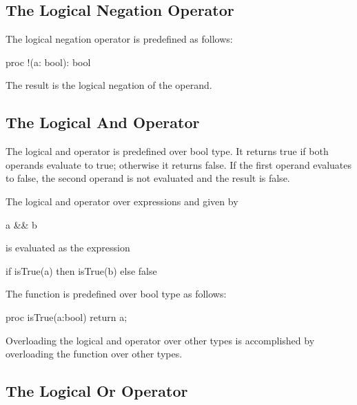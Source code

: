 \subsection{The Logical Negation Operator}
\label{Logical_Negation_Operators}

The logical negation operator is predefined as follows:
\begin{chapel}
proc !(a: bool): bool
\end{chapel}
The result is the logical negation of the operand.

\subsection{The Logical And Operator}
\label{Logical_And_Operators}

The logical and operator is predefined over bool type.  It returns
true if both operands evaluate to true; otherwise it returns false.
If the first operand evaluates to false, the second operand is not
evaluated and the result is false.

The logical and operator over expressions  and  given
by
\begin{chapel}
a && b
\end{chapel}
is evaluated as the expression
\begin{chapel}
if isTrue(a) then isTrue(b) else false
\end{chapel}

The function  is predefined over bool type as follows:
\begin{chapel}
proc isTrue(a:bool) return a;
\end{chapel}
Overloading the logical and operator over other types is accomplished
by overloading the  function over other types.

\subsection{The Logical Or Operator}
\label{Logical_Or_Operators}


